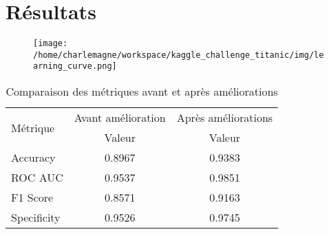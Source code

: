 \documentclass[9pt]{article}
\begin{document}
\clearpage
\section{\textcolor{section}{Résultats}}

\begin{figure}[htbp]
    \centering
    \begin{adjustbox}{width=1\linewidth}
    \texttt{[image: /home/charlemagne/workspace/kaggle\_challenge\_titanic/img/learning\_curve.png]}
    \end{adjustbox}
\end{figure}

\begin{table}[h]
    \centering
    \begin{tabular}{|l|c|c|}
    \hline
    \multirow{2}{*}{Métrique} & Avant amélioration & Après améliorations \\ \cline{2-3} 
                               & Valeur             & Valeur              \\ \hline
    Accuracy                   & 0.8967             & 0.9383              \\ \hline
    ROC AUC                    & 0.9537             & 0.9851              \\ \hline
    F1 Score                   & 0.8571             & 0.9163              \\ \hline
    Specificity                & 0.9526             & 0.9745              \\ \hline
    \end{tabular}
    \caption{Comparaison des métriques avant et après améliorations}
    \label{tab:results}
    \end{table}
\end{document}
